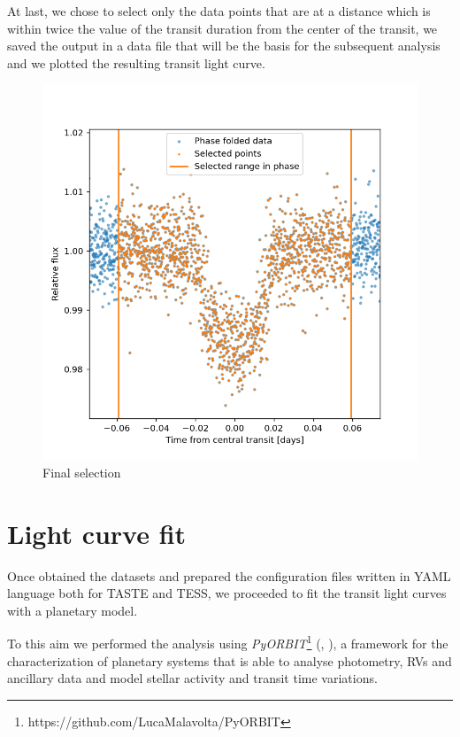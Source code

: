 \documentclass[a4paper,11pt,twocolumn]{article}
\begin{document}
At last, we chose to select only the data points that are at a distance which is within twice the value of the transit duration from the center of the transit, 
we saved the output in a data file that will be the basis for the subsequent analysis and we plotted the resulting transit light curve.
\begin{figure}
  \centering
    \includegraphics[scale=0.3, angle=0]{../pictures/tess/final.png}
    \caption{Final selection}
\end{figure}

\newpage

\section{Light curve fit}

Once obtained the datasets and prepared the configuration files written in YAML language both for TASTE and TESS, we proceeded to fit the transit light curves with a planetary model.

To this aim we performed the analysis using \textit{PyORBIT}\footnote{https://github.com/LucaMalavolta/PyORBIT} (\cite{Malavolta16}, \cite{Malavolta18}), a framework for the characterization of planetary systems that is able to analyse photometry, RVs and ancillary data and model stellar activity and transit time variations.
\end{document}
